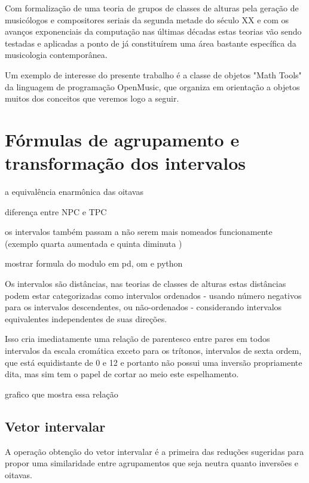\documentclass[
	12pt,				%
	openright,			%
	twoside,			%
	a4paper,			%
	english,			%
	french,				%
	spanish,			%
	brazil				%
	]{abntex2}
\begin{document}
Com formalização de uma teoria de grupos de classes de alturas pela geração de musicólogos e compositores seriais da segunda metade do século XX e com os avanços exponenciais da computação nas últimas décadas estas teorias vão sendo testadas e aplicadas a ponto de já constituírem uma área bastante específica da musicologia contemporânea.\cite{aroundset2013}

Um exemplo de interesse do presente trabalho é a classe de objetos "Math Tools"\cite{andreatta2003implementing,AndreataOMtutorial,DebrilOM} da linguagem de programação OpenMusic, que organiza em orientação a objetos muitos dos conceitos que veremos logo a seguir. 



\section{Fórmulas de agrupamento e transformação dos intervalos}





a equivalência enarmônica das oitavas

diferença entre NPC e TPC \cite[p. 118]{temperley2004cognition}

os intervalos também passam a não serem mais nomeados funcionamente (exemplo quarta aumentada e quinta diminuta )

mostrar formula do modulo em pd, om e python


Os intervalos são distâncias, nas teorias de classes de alturas estas distâncias podem estar categorizadas como intervalos ordenados - usando número negativos para os intervalos descendentes, ou não-ordenados - considerando intervalos equivalentes independentes de suas direções.\cite[pg. 6]{straus2004}


Isso cria imediatamente uma relação de parentesco entre pares em todos intervalos da escala cromática exceto para os trítonos, intervalos de sexta ordem, que está equidistante de 0 e 12 e portanto não possui uma inversão propriamente dita, mas sim tem o papel de cortar ao meio este espelhamento.

grafico que mostra essa relação 




\subsection{Vetor intervalar}

A operação obtenção do vetor intervalar é a primeira das reduções sugeridas para propor uma similaridade entre agrupamentos que seja neutra quanto inversões e oitavas.
\end{document}
